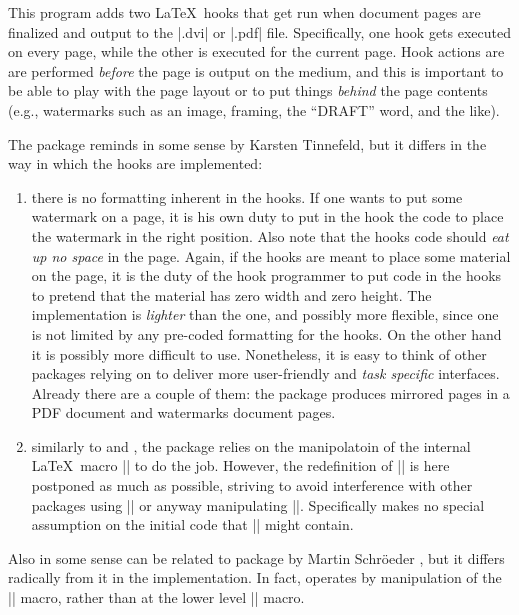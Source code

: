  
 This program adds two \LaTeX\ hooks that get run when document
 pages are finalized and output to the |.dvi| or |.pdf|
 file. Specifically, one hook gets executed on every page, while the
 other is executed for the current page. Hook actions are are performed
 \emph{before} the page is output on the medium, and this is
 important to be able to play with the page layout or to put things
 \emph{behind} the page contents (e.g., watermarks such as an image,
 framing, the ``DRAFT'' word, and the like).
 
 The package reminds in some sense  by Karsten
 Tinnefeld, but it differs in the way in which the hooks are
 implemented:
 


 \begin{enumerate}
 \item there is no formatting inherent in the hooks. If one wants to
   put some watermark on a page, it is his own duty to put in the
   hook the code to place the watermark in the right position. Also
   note that the hooks code should \emph{eat up no space} in the
   page.  Again, if the hooks are meant to place some material on the
   page, it is the duty of the hook programmer to put code in the
   hooks to pretend that the material has zero width and zero height.
   The implementation is \emph{lighter} than the  one,
   and possibly more flexible, since one is not limited by any
   pre-coded formatting for the hooks. On the other hand it is
   possibly more difficult to use. Nonetheless, it is easy to think
   of other packages relying on  to deliver more
   user-friendly and \emph{task specific} interfaces. Already there
   are a couple of them: the package  produces
   mirrored pages in a PDF document and 
   watermarks document pages.
 \item similarly to  and , the
   package relies on the manipolatoin of the internal \LaTeX\ macro
   |\@begindvi| to do the job. However, the redefinition of
   |\@begindvi| is here postponed as much as possible, striving to
   avoid interference with other packages using |\AtBeginDvi| or
   anyway manipulating |\@begindvi|. Specifically 
   makes no special assumption on the initial code that |\@begindvi|
   might contain.
 \end{enumerate}



Also in some sense  can be related to package
  by Martin Schr\"oeder \cite{everyshi}, but it differs radically from
 it in the implementation. In fact, operates by
 manipulation of the |\@begindvi| macro, rather than at the
 lower level |\shipout| macro.

